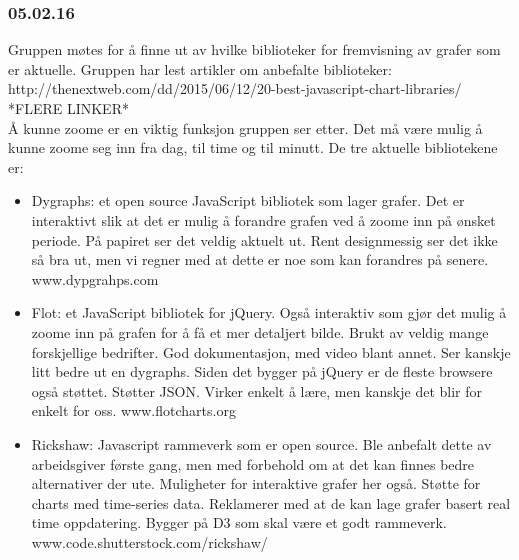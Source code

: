 \documentclass[12pt, oneside]{article}
\begin{document}
\subsubsection{05.02.16}
Gruppen møtes for å finne ut av hvilke biblioteker for fremvisning av grafer som er aktuelle. Gruppen har lest artikler om anbefalte biblioteker:\\
http://thenextweb.com/dd/2015/06/12/20-best-javascript-chart-libraries/\\
*FLERE LINKER*\\
Å kunne zoome er en viktig funksjon gruppen ser etter. Det må være mulig å kunne zoome seg inn fra dag, til time og til minutt. De tre aktuelle bibliotekene er:
\begin{itemize}
	\item Dygraphs: et open source JavaScript bibliotek som lager grafer. Det er interaktivt slik at det er mulig å forandre grafen ved å zoome inn på 		ønsket periode. På papiret ser det veldig aktuelt ut. Rent designmessig ser det ikke så bra ut, men vi regner med at dette er noe som kan 		forandres på senere. www.dypgrahps.com
	\item Flot: et JavaScript bibliotek for jQuery. Også interaktiv som gjør det mulig å zoome inn på grafen for å få et mer detaljert bilde. Brukt av 			veldig mange forskjellige bedrifter. God dokumentasjon, med video blant annet. Ser kanskje litt bedre ut en dygraphs. Siden det bygger på 		jQuery er de fleste browsere også støttet. Støtter JSON. Virker enkelt å lære, men kanskje det blir for enkelt for oss. www.flotcharts.org
	\item Rickshaw: Javascript rammeverk som er open source. Ble anbefalt dette av arbeidsgiver første gang, men med forbehold om at det kan 			finnes bedre alternativer der ute. Muligheter for interaktive grafer her også. Støtte for charts med time-series data. Reklamerer med at de kan 		lage grafer basert real time oppdatering. Bygger på D3 som skal være et godt rammeverk. www.code.shutterstock.com/rickshaw/
\end{itemize}
\end{document}
